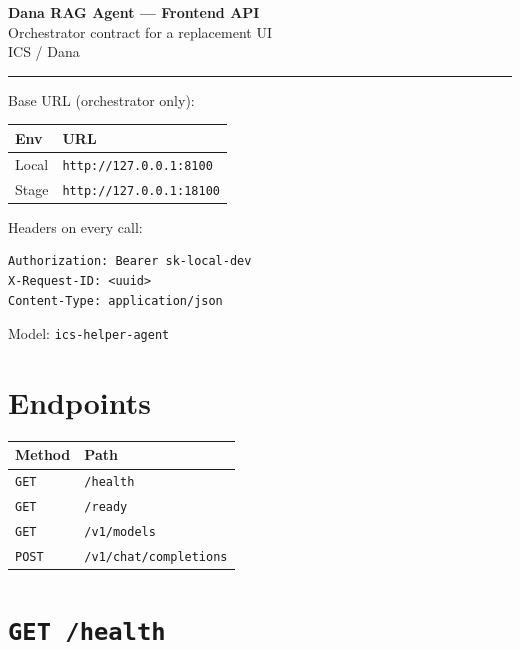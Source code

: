 \documentclass[11pt,a4paper]{article}
\begin{document}
\begin{center}
  {\LARGE\bfseries Dana RAG Agent --- Frontend API}\\[0.4em]
  {\large Orchestrator contract for a replacement UI}\\[0.6em]
  {\small ICS / Dana \quad\textperiodcentered{}}
\end{center}

\vspace{0.6em}
\hrule
\vspace{1em}

\noindent Base URL (orchestrator only):

\begin{center}
\begin{tabular}{@{}ll@{}}
\toprule
\textbf{Env} & \textbf{URL} \\
\midrule
Local & \texttt{http://127.0.0.1:8100} \\
Stage & \texttt{http://127.0.0.1:18100} \\
\bottomrule
\end{tabular}
\end{center}

\noindent Headers on every call:

\begin{lstlisting}
Authorization: Bearer sk-local-dev
X-Request-ID: <uuid>
Content-Type: application/json
\end{lstlisting}

\noindent Model: \texttt{ics-helper-agent}

\section{Endpoints}

\begin{center}
\begin{tabular}{@{}ll@{}}
\toprule
\textbf{Method} & \textbf{Path} \\
\midrule
\texttt{GET}  & \texttt{/health} \\
\texttt{GET}  & \texttt{/ready} \\
\texttt{GET}  & \texttt{/v1/models} \\
\texttt{POST} & \texttt{/v1/chat/completions} \\
\bottomrule
\end{tabular}
\end{center}

\section{\texttt{GET /health}}
\end{document}
